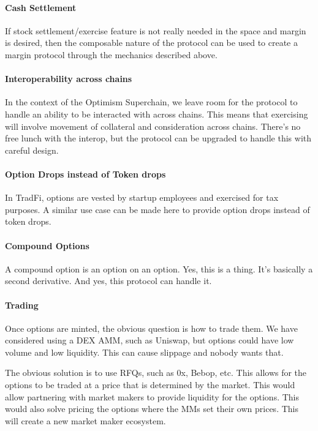 \documentclass[%
 reprint,
 amsmath,amssymb,
 aps,
]{revtex4-2}
\begin{document}
\paragraph*{Cash Settlement}
If stock settlement/exercise feature is not really needed in the space and margin is desired, 
then the composable nature of the protocol can be used to create a margin protocol through the mechanics described above. 


\paragraph*{Interoperability across chains}

In the context of the Optimism Superchain, we leave room for the protocol to handle an ability to be interacted with across chains.
This means that exercising will involve movement of collateral and consideration across chains.
There's no free lunch with the interop, but the protocol can be upgraded to handle this with careful design.

\paragraph*{Option Drops instead of Token drops}
In TradFi, options are vested by startup employees and exercised for tax purposes.
A similar use case can be made here to provide option drops instead of token drops.

\paragraph*{Compound Options}
A compound option is an option on an option. Yes, this is a thing. It's basically a second derivative.
And yes, this protocol can handle it. 

\paragraph*{Trading}

Once options are minted, the obvious question is how to trade them. We
have considered using a DEX AMM, such as Uniswap, but options could have
low volume and low liquidity. This can cause slippage and nobody wants
that.

The obvious solution is to use RFQs, such as 0x, Bebop, etc. This allows
for the options to be traded at a price that is determined by the
market. This would allow partnering with market makers to provide
liquidity for the options. This would also solve pricing the options
where the MMs set their own prices. This will create a new market maker
ecosystem.
\end{document}
